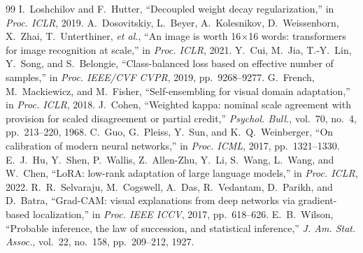 \documentclass[journal]{IEEEtran}
\begin{document}
\begin{thebibliography}{99}
 I.~Loshchilov and F.~Hutter, ``Decoupled weight decay regularization,'' in \emph{Proc. ICLR}, 2019.
 A.~Dosovitskiy, L.~Beyer, A.~Kolesnikov, D.~Weissenborn, X.~Zhai, T.~Unterthiner, \emph{et al.}, ``An image is worth 16$\times$16 words: transformers for image recognition at scale,'' in \emph{Proc. ICLR}, 2021.
 Y.~Cui, M.~Jia, T.-Y.~Lin, Y.~Song, and S.~Belongie, ``Class-balanced loss based on effective number of samples,'' in \emph{Proc. IEEE/CVF CVPR}, 2019, pp.~9268--9277.
 G.~French, M.~Mackiewicz, and M.~Fisher, ``Self-ensembling for visual domain adaptation,'' in \emph{Proc. ICLR}, 2018.
 J.~Cohen, ``Weighted kappa: nominal scale agreement with provision for scaled disagreement or partial credit,'' \emph{Psychol. Bull.}, vol.~70, no.~4, pp.~213--220, 1968.
 C.~Guo, G.~Pleiss, Y.~Sun, and K.~Q.~Weinberger, ``On calibration of modern neural networks,'' in \emph{Proc. ICML}, 2017, pp.~1321--1330.
 E.~J.~Hu, Y.~Shen, P.~Wallis, Z.~Allen-Zhu, Y.~Li, S.~Wang, L.~Wang, and W.~Chen, ``LoRA: low-rank adaptation of large language models,'' in \emph{Proc. ICLR}, 2022.
 R.~R.~Selvaraju, M.~Cogswell, A.~Das, R.~Vedantam, D.~Parikh, and D.~Batra, ``Grad-CAM: visual explanations from deep networks via gradient-based localization,'' in \emph{Proc. IEEE ICCV}, 2017, pp.~618--626.
 E.~B.~Wilson, ``Probable inference, the law of succession, and statistical inference,'' \emph{J. Am. Stat. Assoc.}, vol.~22, no.~158, pp.~209--212, 1927.
\end{thebibliography}
\end{document}
